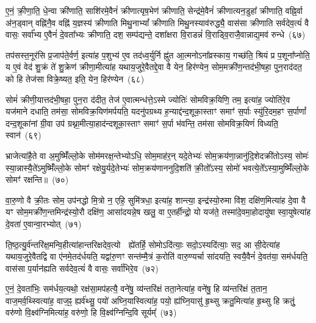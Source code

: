 ए॒नं॒ क्री॒णा॒ति॒ धे॒न्वा क्री॑णाति॒ साशि॑रमे॒वैनं॑ क्रीणात्यृष॒भेण॑ क्रीणाति॒ सेन्द्र॑मे॒वैनं॑ क्रीणात्यन॒डुहा᳚ क्रीणाति॒ वह्नि॒र्वा अ॑न॒ड्वान् वह्नि॑नै॒व वह्नि॑ य॒ज्ञस्य॑ क्रीणाति मिथु॒ना\-भ्यां᳚ क्रीणाति मिथु॒नस्याव॑रुद्ध्यै॒ वास॑सा क्रीणाति सर्वदेव॒त्यं॑ वै वासः॒ सर्वा᳚भ्य ए॒वैनं॑ दे॒वता᳚भ्यः क्रीणाति॒ दश॒ सम्प॑द्यन्ते॒ दशा᳚क्षरा वि॒राडन्नं॑ वि॒राड्वि॒राजै॒वान्नाद्य॒मव॑ रुन्धे~(६७)

तप॑सस्त॒नूर॑सि प्र॒जाप॑ते॒र्वर्ण॒ इत्या॑ह प॒शुभ्य॑ ए॒व तद॑ध्व॒र्युर्नि ह्नु॑त आ॒त्मनो\-ऽना᳚व्रस्काय॒ गच्छ॑ति॒ श्रियं प्र प॒शूना᳚प्नोति॒ य ए॒वं वेद॑ शु॒क्रं ते॑ शु॒क्रेण॑ क्रीणा॒मीत्या॑ह यथाय॒जुरे॒वैतद्दे॒वा वै येन॒ हिर॑ण्येन॒ सोम॒मक्री॑ण॒न्तद॑भी॒षहा॒ पुन॒राद॑दत॒ को हि तेज॑सा विक्रे॒ष्यत॒ इति॒ येन॒ हिर॑ण्येन~(६८)

सोमं॑ क्रीणी॒यात्तद॑भी॒षहा॒ पुन॒रा द॑दीत॒ तेज॑ ए॒वात्मन्ध॑त्ते॒\-ऽस्मे ज्योतिः॑ सोमविक्र॒यिणि॒ तम॒ इत्या॑ह॒ ज्योति॑रे॒व यज॑माने दधाति॒ तम॑सा॒ सोमविक्र॒यिण॑मर्पयति॒ यदनु॑पग्रथ्य ह॒न्याद्द॑न्द॒शूका॒स्ताꣳ समाꣳ॑ स॒र्पाः स्यु॑रि॒दम॒हꣳ स॒र्पाणां᳚ दन्द॒शूका॑नां ग्री॒वा उप॑ ग्रथ्ना॒मीत्या॒हाद॑न्दशूका॒स्ताꣳ समाꣳ॑ स॒र्पा भ॑वन्ति॒ तम॑सा सोमविक्र॒यिणं॑ विध्यति॒ स्वान॑~(६९)

भ्राजेत्या॑है॒ते वा अ॒मुष्मिँ॑ल्लो॒के सोम॑मरक्ष॒न्तेभ्यो\-ऽधि॒ सोम॒माह॑र॒न् यदे॒तेभ्यः॑ सोम॒क्रय॑णा॒न्नानु॑दि॒शेदक्री॑तो\-ऽस्य॒ सोमः॑ स्या॒न्नास्यै॒ते॑\-ऽमुष्मिँ॑ल्लो॒के सोमꣳ॑ रक्षेयु॒र्यदे॒तेभ्यः॑ सोम॒क्रय॑णाननुदि॒शति॑ क्री॒तो᳚\-ऽस्य॒ सोमो॑ भवत्ये॒ते᳚\-ऽस्या॒मुष्मिँ॑ल्लो॒के सोमꣳ॑ रक्षन्ति॥~(७०)

{\anuvakamend[{सशु॑क्रमे॒व रु॑न्ध॒ इति॒ येन॒ हिर॑ण्येन॒ स्वान॒ चतु॑श्चत्वारिꣳशच्च}]}%

वा॒रु॒णो वै क्री॒तः सोम॒ उप॑नद्धो मि॒त्रो न॒ एहि॒ सुमि॑त्रधा॒ इत्या॑ह॒ शान्त्या॒ इन्द्र॑स्यो॒रुमा वि॑श॒ दक्षि॑ण॒मित्या॑ह दे॒वा वै यꣳ सोम॒मक्री॑ण॒न्तमिन्द्र॑स्यो॒रौ दक्षि॑ण॒ आसा॑दयन्ने॒ष खलु॒ वा ए॒तर्\mbox{}हीन्द्रो॒ यो यज॑ते॒ तस्मा॑दे॒वमा॒होदायु॑षा स्वा॒युषेत्या॑ह दे॒वता॑ ए॒वान्वा॒रभ्योत्~(७१)

ति॒ष्ठ॒त्यु॒र्व॑न्तरि॑क्ष॒मन्वि॒हीत्या॑हान्तरिक्षदेव॒त्यो  ह्ये॑तर्\mbox{}हि॒ सोमो\-ऽदि॑त्याः॒ सदो॒\-ऽस्यदि॑त्याः॒ सद॒ आ सी॒देत्या॑ह यथाय॒जुरे॒वैतद्वि वा ए॑नमे॒तद॑र्धयति॒ यद्वा॑रु॒णꣳ सन्त॑म्मै॒त्रं क॒रोति॑ वारु॒ण्यर्चा सा॑दयति॒ स्वयै॒वैनं॑ दे॒वत॑या॒ सम॑र्धयति॒ वास॑सा प॒र्यान॑ह्यति सर्वदेव॒त्यं॑ वै वासः॒ सर्वा॑भिरे॒व~(७२)

ए॒नं॒ दे॒वता॑भिः॒ सम॑र्धय॒त्यथो॒ रक्ष॑सा॒मप॑हत्यै॒ वने॑षु॒ व्य॑न्तरि॑क्षं तता॒नेत्या॑ह॒ वने॑षु॒ हि व्य॑न्तरि॑क्षं त॒तान॒ वाज॒मर्व॒थ्स्वित्या॑ह॒ वाज॒ꣴ॒ ह्यर्व॑थ्सु॒ पयो॑ अघ्नि॒यास्वित्या॑ह॒ पयो॒ ह्य॑घ्नि॒यासु॑ हृ॒थ्सु क्रतु॒मित्या॑ह हृ॒थ्सु हि क्रतुं॒ वरु॑णो वि॒क्ष्व॑ग्निमित्या॑ह॒ वरु॑णो॒ हि वि॒क्ष्व॑ग्निन्दि॒वि सूर्यम्᳚~(७३)

